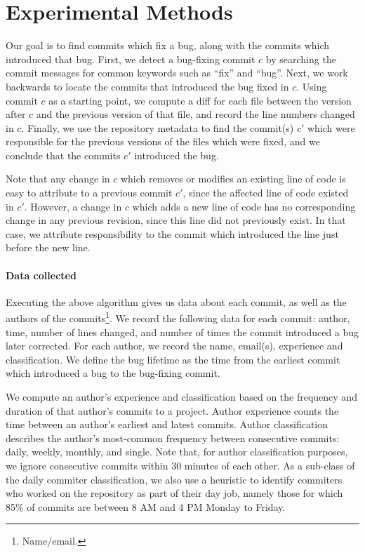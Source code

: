 \section{Experimental Methods}
\label{sec:method}
Our goal is to find commits which fix a bug, along with the commits
which introduced that bug. First, we detect a bug-fixing commit $c$ by
searching the commit messages for common keywords such as ``fix'' and
``bug''. Next, we work backwards to locate the commits that introduced
the bug fixed in $c$. Using commit $c$ as a starting point, we compute
a diff for each file between the version after $c$ and the previous
version of that file, and record the line numbers changed in
$c$. Finally, we use the repository metadata to find the commit(s)
$c'$ which were responsible for the previous versions of the files
which were fixed, and we conclude that the commits $c'$ introduced the
bug.

Note that any change in $c$ which removes or modifies an existing line
of code is easy to attribute to a previous commit $c'$, since the
affected line of code existed in $c'$. However, a change in $c$ which
adds a new line of code has no corresponding change in any previous
revision, since this line did not previously exist. In that case, we
attribute responsibility to the commit which introduced the line just
before the new line.

\paragraph{Data collected}
Executing the above algorithm gives us data about each commit, as well
as the authors of the commits\footnote{Name/email.}.  We record the
following data for each commit: author, time, number of lines changed,
and number of times the commit introduced a bug later corrected. For
each author, we record the name, email(s), experience and
classification. We define the bug lifetime as the time from the
earliest commit which introduced a bug to the bug-fixing commit.

We compute an author's experience and classification based on the
frequency and duration of that author's commits to a project. Author
experience counts the time between an author's earliest and latest
commits. Author classification describes the author's most-common
frequency between consecutive commits: daily, weekly, monthly, and
single. Note that, for author classification purposes, we ignore
consecutive commits within 30 minutes of each other. As a sub-class of
the daily commiter classification, we also use a heuristic to identify
commiters who worked on the repository as part of their day job,
namely those for which 85\% of commits are between 8 AM and 4 PM
Monday to Friday.

